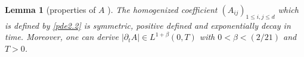 \documentclass[13pt,CJK]{article}
\theoremstyle{plain}                       %
\newtheorem{lemma}{Lemma}[section]
\theoremstyle{remark}
\numberwithin{equation}{section}
\begin{document}
\begin{lemma}[properties of $A$ \cite{Allaire92,Lions81,Mikelic91,Sandrakov97}]\label{lemma2.5}
The homogenized coefficient $(A_{ij})_{1\leq i,j\leq d}$ which is defined by \eqref{pde2.2} is symmetric, positive defined and exponentially decay in time. Moreover, one can derive
$|\partial_tA|\in L^{1+\beta}(0,T)$ with
$0<\beta<(2/21)$ and $T>0$.
\end{lemma}
%
%
%
%
\end{document}

